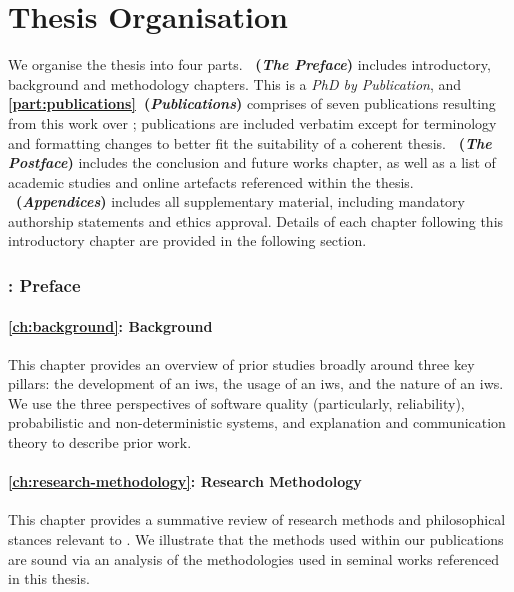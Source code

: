 \section{Thesis Organisation}
\label{sec:introduction:organisation}

We organise the thesis into four parts. \textbf{~(\textit{The Preface})} includes introductory, background and methodology chapters. This is a \textit{PhD by Publication}, and \textbf{\cref{part:publications}~(\textit{Publications})} comprises of seven publications resulting from this work over ; publications are included verbatim except for terminology and formatting changes to better fit the suitability of a coherent thesis. \textbf{~(\textit{The Postface})} includes the conclusion and future works chapter, as well as a list of academic studies and online artefacts referenced within the thesis. \textbf{~(\textit{Appendices})} includes all supplementary material, including mandatory authorship statements and ethics approval. Details of each chapter following this introductory chapter are provided in the following section.

\subsubsection{: Preface}

\paragraph{\cref{ch:background}: Background} This chapter provides an overview of prior studies broadly around three key pillars: the development of an \gls{iws}, the usage of an \gls{iws}, and the nature of an \gls{iws}. We use the three perspectives of software quality (particularly, reliability), probabilistic and non-deterministic systems, and explanation and communication theory to describe prior work.

\paragraph{\cref{ch:research-methodology}: Research Methodology} This chapter provides a summative review of research methods and philosophical stances relevant to . We illustrate that the methods used within our publications are sound via an analysis of the methodologies used in seminal works referenced in this thesis.

